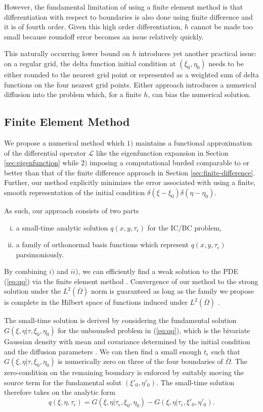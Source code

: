 \documentclass[10pt]{article}
\begin{document}
However, the fundamental limitation of using a finite element method
is that differentiation with respect to boundaries is also done using
finite difference and it is of fourth order. Given this high order
differentiation, $h$ cannot be made too small because roundoff error
becomes an issue relatively quickly.

This naturally occurring lower bound on $h$ introduces yet another
practical issue: on a regular grid, the delta function initial
condition at $(\xi_0, \eta_0)$ needs to be either rounded to the
nearest grid point or represented as a weighted sum of delta functions
on the four nearest grid points. Either approach introduces a
numerical diffusion into the problem which, for a finite $h$, can bias
the numerical solution.

\subsection{Finite Element Method}
We propose a numerical method which $1)$ maintains a functional
approximation of the differential operator $\mathcal{L}$ like the
eigenfunction expansion in Section \ref{sec:eigenfunction} while $2)$
imposing a computational burded comparable to or better than that of
the finite difference approach in Section
\ref{sec:finite-difference}. Further, our method explicitly minimizes
the error associated with using a finite, smooth representation of the
initial condition $\delta(\xi-\xi_0)\delta(\eta-\eta_0)$.

As such, our approach consists of two parts
\begin{enumerate}[i)]
\item a small-time analytic solution $q(x,y,\tau_\epsilon)$ for the IC/BC problem,
\item a family of orthonormal basis functions which represent
  $q(x,y,\tau_\epsilon)$ parsimoniously.
\end{enumerate}
By combining $i)$ and $ii)$, we can efficiently find a weak solution to the
PDE (\ref{eq:qq}) via the finite element method
\citep{shaidurov2013multigrid}. Convergence of our method to the
strong solution under the $L^2(\bar{\Omega})$ norm is guaranteed as
long as the family we propose is complete in the Hilbert space of
functions induced under $L^2(\bar{\Omega})$ \citep{salsa2016partial}.

The small-time solution is derived by considering the fundamental
solution $G(\xi,\eta |\tau, \xi_0, \eta_0)$ for the unbounded problem
in (\ref{eq:qq}), which is the bivariate Gaussian density with mean
and covariance determined by the initial condition and the diffusion
parameters \citep{stakgold2011green}. We can then find a small enough
$t_\epsilon$ such that $G(\xi,\eta |\tau, \xi_0, \eta_0)$ is
numerically zero on three of the four boundaries of
$\bar{\Omega}$. The zero-condition on the remaining boundary is
enforced by suitably moving the source term for the fundamental solut
$(\xi'_0, \eta'_0)$. The small-time solution
therefore takes on the analytic form
\[
  q(\xi,\eta,\tau_\epsilon) = G(\xi,\eta|\tau_\epsilon,\xi_0, \eta_0) - G(\xi,\eta|\tau_\epsilon,\xi'_0, \eta'_0).
\]
\end{document}
